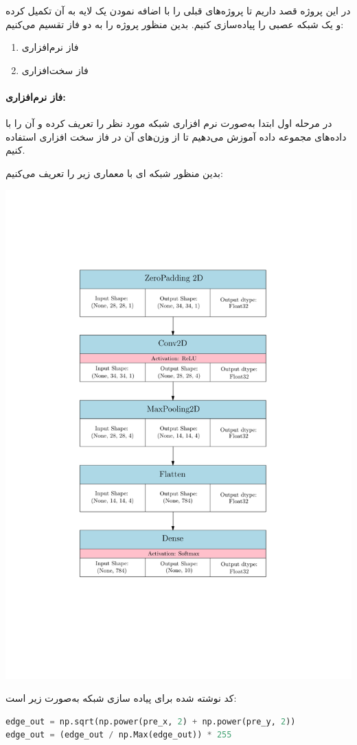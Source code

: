 \begin{qsolve}
	در این پروژه قصد داریم تا پروژه‌های قبلی را با اضافه نمودن یک لایه  به آن تکمیل کرده و یک شبکه عصبی  را پیاده‌سازی کنیم. بدین منظور پروژه را به دو فاز تقسیم می‌کنیم:
	\begin{enumerate}
		\item فاز نرم‌افزاری
		\item فاز سخت‌افزاری
	\end{enumerate}
	
	\paragraph{فاز نرم‌افزاری:}
	
	در مرحله اول ابتدا به‌صورت نرم افزاری شبکه مورد نظر را تعریف کرده و آن را با داده‌های مجموعه داده  آموزش می‌دهیم تا از وزن‌های آن در فاز سخت افزاری استفاده کنیم.
	
	بدین منظور شبکه ای با معماری زیر را تعریف می‌کنیم:
	
	\begin{center}
		\includegraphics*[width=0.6\linewidth]{pics/img2.pdf}
		\label{معماری شبکه مورد نظر}
	\end{center}

	کد نوشته شده برای پیاده سازی شبکه به‌صورت زیر است:
\end{qsolve}

\begin{qsolve}
	
\end{qsolve}
	
\begin{latin}
\begin{lstlisting}[language=Python,caption={Model Definition}]
edge_out = np.sqrt(np.power(pre_x, 2) + np.power(pre_y, 2))
edge_out = (edge_out / np.Max(edge_out)) * 255
\end{lstlisting}
\end{latin}








